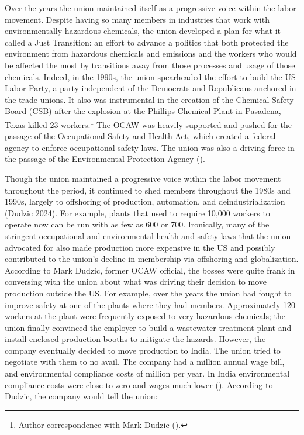 \documentclass[12pt]{article}
\begin{document}
Over the years the union maintained itself as a progressive voice within the labor movement. Despite having so many members in industries that work with environmentally hazardous chemicals, the union developed a plan for what it called a Just Transition: an effort to advance a politics that both protected the environment from hazardous chemicals and emissions and the workers who would be affected the most by transitions away from those processes and usage of those chemicals. Indeed, in the 1990s, the union  spearheaded the effort to build the US Labor Party, a party independent of the Democrats and Republicans anchored in the trade unions. It also was instrumental in the creation of the Chemical Safety Board (CSB) after the explosion at the Phillips Chemical Plant in Pasadena, Texas killed 23 workers.\footnote{Author correspondence with Mark Dudzic (\citeyear{dudzicInterview2024}).} The OCAW was heavily supported and pushed for the passage of the Occupational Safety and Health Act, which created a federal agency to enforce occupational safety laws. The union was also a driving force in the passage of the Environmental Protection Agency (\cite{leopoldManWhoHated2007}).

Though the union maintained a progressive voice within the labor movement throughout the period, it continued to shed members throughout the 1980s and 1990s, largely to offshoring of production, automation, and deindustrialization (Dudzic 2024). For example, plants that used to require 10,000 workers to operate now can be run with as few as 600 or 700. Ironically, many of the stringent occupational and environmental health and safety laws that the union advocated for also made production more expensive in the US and possibly contributed to the union’s decline in membership via offshoring and globalization. According to Mark Dudzic, former OCAW official, the bosses were quite frank in conversing with the union about what was driving their decision to move production outside the US. For example, over the years the union had fought to improve safety at one of the plants where they had members. Approximately 120 workers at the plant were frequently exposed to very hazardous chemicals; the union finally convinced the employer to build a wastewater treatment plant and install enclosed production booths to mitigate the hazards. However, the company eventually decided to move production to India. The union tried to negotiate with them to no avail. The company had a   million annual wage bill, and environmental compliance costs of   million per year. In India environmental compliance costs were close to zero and wages much lower (\cite{dudzicInterview2024}). According to Dudzic, the company would tell the union:
\end{document}
